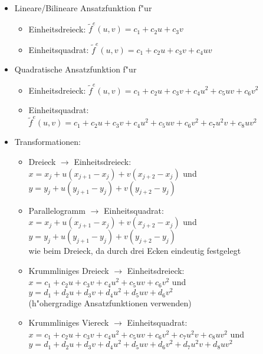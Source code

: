 \begin{itemize}
\item Lineare/Bilineare Ansatzfunktion f"ur
    \begin{itemize}
    \item Einheitsdreieck: $\tilde{f}^e(u,v)=c_1+c_2u+c_3v$
    \item Einheitsquadrat: $\tilde{f}^e(u,v)=c_1+c_2u+c_3v+c_4uv$
    \end{itemize}
\item Quadratische Ansatzfunktion f"ur
    \begin{itemize}
    \item Einheitsdreieck:
      $\tilde{f}^e(u,v)=c_1+c_2u+c_3v+c_4u^2+c_5uv+c_6v^2$
    \item Einheitsquadrat:
      $\tilde{f}^e(u,v)=c_1+c_2u+c_3v+c_4u^2+c_5uv+c_6v^2+c_7u^2v+c_8uv^2$
    \end{itemize}
\item Transformationen:
   \begin{itemize}
   \item Dreieck $\rightarrow$ Einheitsdreieck:\\
     $x=x_j+u(x_{j+1}-x_j)+v(x_{j+2}-x_j)$ und\\
     $y=y_j+u(y_{j+1}-y_j)+v(y_{j+2}-y_j)$
   \item Parallelogramm $\rightarrow$ Einheitsquadrat:\\
     $x=x_j+u(x_{j+1}-x_j)+v(x_{j+2}-x_j)$ und \\
     $y=y_j+u(y_{j+1}-y_j)+v(y_{j+2}-y_j)$\\
     wie beim Dreieck, da durch drei Ecken eindeutig festgelegt
   \item Krummliniges Dreieck $\rightarrow$ Einheitsdreieck:\\
     $x=c_1+c_2u+c_3v+c_4u^2+c_5uv+c_6v^2$ und \\
     $y=d_1+d_2u+d_3v+d_4u^2+d_5uv+d_6v^2$ \\
     (h"ohergradige Ansatzfunktionen verwenden)
   \item Krummliniges Viereck $\rightarrow$ Einheitsquadrat:\\
     $x=c_1+c_2u+c_3v+c_4u^2+c_5uv+c_6v^2+c_7u^2v+c_8uv^2$ und\\
     $y=d_1+d_2u+d_3v+d_4u^2+d_5uv+d_6v^2+d_7u^2v+d_8uv^2$
   \end{itemize}
\end{itemize}


